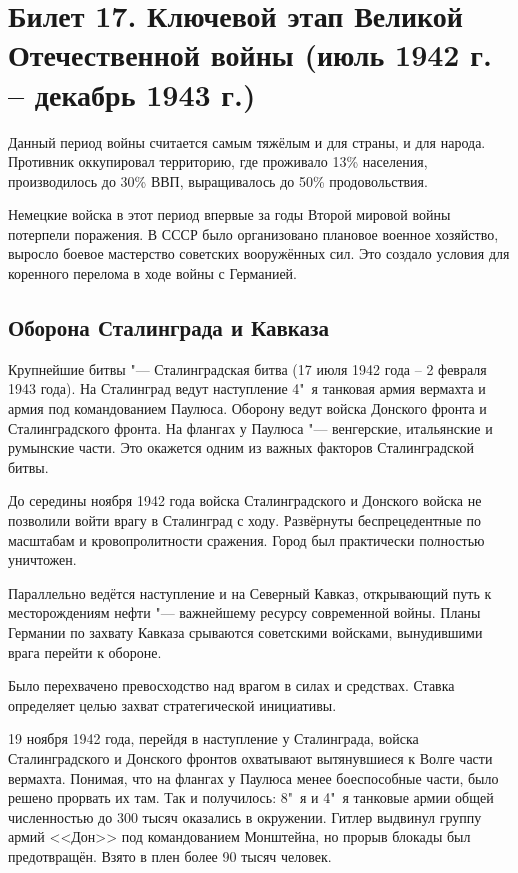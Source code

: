 \section{Билет 17. Ключевой этап Великой Отечественной войны (июль 1942 г. -- декабрь 1943 г.)}

Данный период войны считается самым тяжёлым и для страны, и для народа.
Противник оккупировал территорию, где проживало 13\% населения, производилось до 30\% ВВП, выращивалось до 50\% продовольствия.

Немецкие войска в этот период впервые за годы Второй мировой войны потерпели поражения.
В СССР было организовано плановое военное хозяйство, выросло боевое мастерство советских вооружённых сил. Это создало условия для коренного перелома в ходе войны с Германией.

\subsection{Оборона Сталинграда и Кавказа}

Крупнейшие битвы "--- Сталинградская битва (17 июля 1942 года -- 2 февраля 1943 года). На Сталинград ведут наступление 4"~я танковая армия вермахта и армия под командованием Паулюса. Оборону ведут войска Донского фронта и Сталинградского фронта.
На флангах у Паулюса "--- венгерские, итальянские и румынские части. Это окажется одним из важных факторов Сталинградской битвы.

До середины ноября 1942 года войска Сталинградского и Донского войска не позволили войти врагу в Сталинград с ходу. Развёрнуты беспрецедентные по масштабам и кровопролитности сражения. Город был практически полностью уничтожен.

Параллельно ведётся наступление и на Северный Кавказ, открывающий путь к месторождениям нефти "--- важнейшему ресурсу современной войны. Планы Германии по захвату Кавказа срываются советскими войсками, вынудившими врага перейти к обороне.

Было перехвачено превосходство над врагом в силах и средствах. Ставка определяет целью захват стратегической инициативы.

19 ноября 1942 года, перейдя в наступление у Сталинграда, войска Сталинградского и Донского фронтов охватывают вытянувшиеся к Волге части вермахта. Понимая, что на флангах у Паулюса менее боеспособные части, было решено прорвать их там. Так и получилось: 8"~я и 4"~я танковые армии общей численностью до 300 тысяч оказались в окружении. Гитлер выдвинул группу армий <<Дон>> под командованием Монштейна, но прорыв блокады был предотвращён. Взято в плен более 90 тысяч человек.


